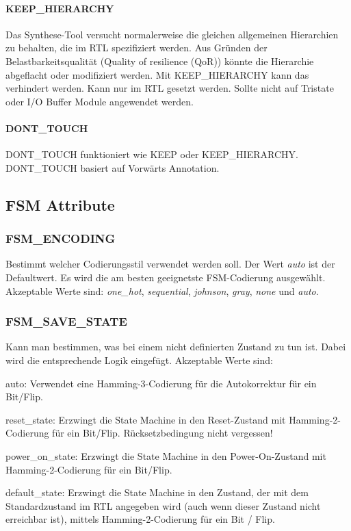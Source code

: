\paragraph{KEEP\_HIERARCHY}
Das Synthese-Tool versucht normalerweise die gleichen allgemeinen Hierarchien zu behalten, die im RTL spezifiziert werden. Aus Gründen der Belastbarkeitsqualität (Quality of resilience (QoR)) könnte die Hierarchie abgeflacht oder modifiziert werden. Mit KEEP\_HIERARCHY kann das verhindert werden. Kann nur im RTL gesetzt werden. Sollte nicht auf Tristate oder I/O Buffer Module angewendet werden.

\paragraph{DONT\_TOUCH}
DONT\_TOUCH funktioniert wie KEEP oder KEEP\_HIERARCHY. DONT\_TOUCH basiert auf Vorwärts Annotation.

\subsection{FSM Attribute}
\subsubsection{FSM\_ENCODING}
Bestimmt welcher Codierungsstil verwendet werden soll. Der Wert \textit{auto} ist der Defaultwert. Es wird die am besten geeignetste FSM-Codierung ausgewählt. Akzeptable Werte sind: \textit{one\_hot}, \textit{sequential}, \textit{johnson}, \textit{gray}, \textit{none} und \textit{auto}.

\subsubsection{FSM\_SAVE\_STATE}
Kann man bestimmen, was bei einem nicht definierten Zustand zu tun ist. Dabei wird die entsprechende Logik eingefügt. Akzeptable Werte sind:
\begin{compactitem}
    \item auto: Verwendet eine Hamming-3-Codierung für die Autokorrektur für ein Bit/Flip.
    \item reset\_state: Erzwingt die State Machine in den Reset-Zustand mit Hamming-2-Codierung für ein Bit/Flip. Rücksetzbedingung nicht vergessen!
    \item power\_on\_state: Erzwingt die State Machine in den Power-On-Zustand mit Hamming-2-Codierung für ein Bit/Flip.
    \item default\_state: Erzwingt die State Machine in den Zustand, der mit dem Standardzustand im RTL angegeben wird (auch wenn dieser Zustand nicht erreichbar ist), mittels Hamming-2-Codierung für ein Bit / Flip.
\end{compactitem}

